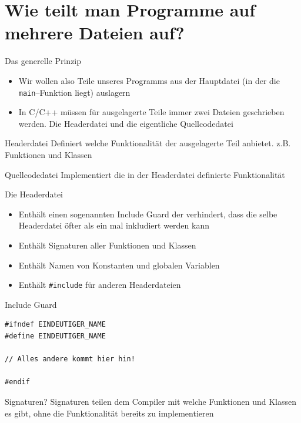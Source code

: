 \documentclass[presentation]{beamer}
\begin{document}
\section{Wie teilt man Programme auf mehrere Dateien auf?}
\label{sec:org06e1dcc}
\begin{frame}[label={sec:org64a79e6},fragile]{Das generelle Prinzip}
 \begin{itemize}
\item Wir wollen also Teile unseres Programms aus der Hauptdatei (in der
die {\color{solarizedYellow}\texttt{main}}--Funktion liegt) auslagern
\item In C/C++ müssen für ausgelagerte Teile immer zwei Dateien
geschrieben werden. Die \alert{Headerdatei} und die eigentliche
\alert{Quellcodedatei}
\end{itemize}
\begin{block}{Headerdatei}
Definiert \alert{welche Funktionalität} der ausgelagerte Teil anbietet. z.B.
Funktionen und Klassen
\end{block}
\begin{block}{Quellcodedatei}
\alert{Implementiert} die in der Headerdatei definierte Funktionalität
\end{block}
\end{frame}
\begin{frame}[label={sec:org493deab},fragile]{Die Headerdatei}
 \begin{itemize}
\item Enthält einen sogenannten \alert{Include Guard} der verhindert, dass die
selbe Headerdatei öfter als ein mal inkludiert werden kann
\item Enthält \alert{Signaturen} aller Funktionen und Klassen
\item Enthält Namen von \alert{Konstanten} und \alert{globalen Variablen}
\item Enthält {\color{solarizedYellow}\texttt{\#include} }für anderen Headerdateien
\end{itemize}
\begin{block}{Include Guard}
\begin{verbatim}
#ifndef EINDEUTIGER_NAME
#define EINDEUTIGER_NAME

// Alles andere kommt hier hin!

#endif
\end{verbatim}
\end{block}
\begin{block}{Signaturen?}
Signaturen teilen dem Compiler mit welche Funktionen und Klassen es
gibt, ohne die Funktionalität bereits zu implementieren
\end{block}
\end{frame}
\end{document}
